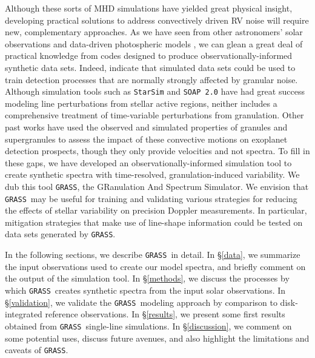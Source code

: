 \documentclass[twocolumn]{aastex63}
\newcommand{\grass}{\texttt{GRASS}}
\newcommand{\revise}[1]{#1}
\begin{document}


Although these sorts of MHD simulations have yielded great physical insight, developing practical solutions to address convectively driven RV noise will require \revise{new, complementary} approaches. As we have seen from other astronomers' solar observations and data-driven photospheric models \citep[e.g.,][]{Dumusque2014, Haywood2016}, we can glean a great deal of practical knowledge from codes designed to produce observationally-informed synthetic data sets. \revise{Indeed, \citet{Sulis2017} indicate that simulated data sets could be used to train detection processes that are normally strongly affected by granular noise.} Although \revise{simulation tools such as} \texttt{StarSim} and \texttt{SOAP 2.0} have had great success modeling line perturbations from stellar active regions, neither includes a comprehensive treatment of time-variable perturbations from granulation. \revise{Other past works have used the observed and simulated properties of granules \citep{Meunier2015} and supergranules \citep{Meunier2019, Meunier2020a} to assess the impact of these convective motions on exoplanet detection prospects, though they only provide velocities and not spectra.} To fill in \revise{these gaps,} we have developed an observationally-informed simulation tool to create synthetic spectra with time-resolved, granulation-induced variability. We dub this tool \texttt{GRASS}, the GRanulation And Spectrum Simulator. \revise{We envision that \grass\ may be useful for training and validating various strategies for reducing the effects of stellar variability on precision Doppler measurements. In particular, mitigation strategies that make use of line-shape information could be tested on data sets generated by \grass. } \par 

In the following sections, we describe \grass\ in detail. In \S\ref{data}, we summarize the input observations used to create our model spectra, and briefly comment on the output of the simulation tool. In \S\ref{methods}, we discuss the processes by which \grass\ creates synthetic spectra from the input solar observations. In \S\ref{validation}, we validate the \grass\ modeling approach by comparison to disk-integrated reference observations. In \S\ref{results}, we present some first results obtained from \grass\ single-line simulations. In \S\ref{discussion}, we comment on some potential uses, discuss future avenues, and also highlight the limitations and caveats of \grass. \par 
\end{document}
